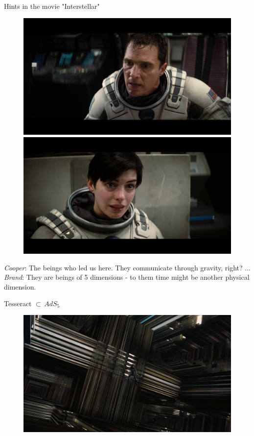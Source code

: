 \documentclass{beamer}
\begin{document}
\begin{frame}{Hints in the movie "Interstellar"}
		\begin{figure}[!htb]
	\includegraphics[width=1.5\linewidth]{images/1199149.jpg} 
	\endminipage\hfill
	\includegraphics[width=1.5\linewidth]{images/1199158.jpg}
	\endminipage\hfill
\end{figure}
\emph{Cooper}: The beings who led us here. They communicate through gravity, right? ... \emph{Brand}: They are beings of 5 dimensions - to them time might be another physical dimension.
	
\end{frame}

\begin{frame}{Tesseract $\subset \, AdS_5$}
		\begin{figure}
			\includegraphics[width=\textwidth]{images/1201172.jpg}
		\end{figure}
\end{frame}
\end{document}
